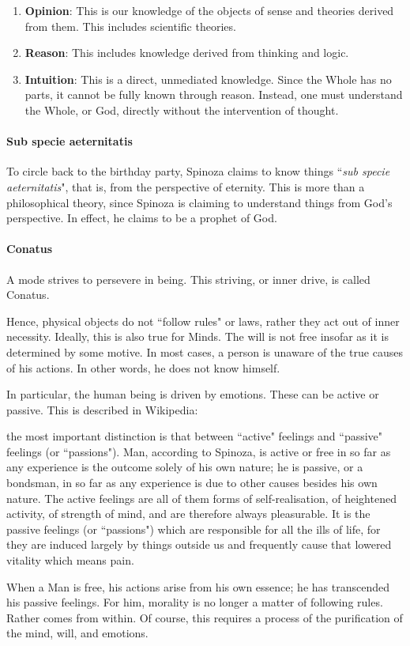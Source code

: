 \begin{enumerate}
\item \textbf{Opinion}: This is our knowledge of the objects of sense and theories derived from them. This includes scientific theories. 
\item \textbf{Reason}: This includes knowledge derived from thinking and logic. 
\item \textbf{Intuition}: This is a direct, unmediated knowledge. Since the Whole has no parts, it cannot be fully known through reason. Instead, one must understand the Whole, or God, directly without the intervention of thought. 
\end{enumerate}
\paragraph{Sub specie aeternitatis}
To circle back to the birthday party, Spinoza claims to know things ``\emph{sub specie aeternitatis}", that is, from the perspective of eternity. This is more than a philosophical theory, since Spinoza is claiming to understand things from God's perspective. In effect, he claims to be a prophet of God.

\paragraph{Conatus}
A mode strives to persevere in being. This striving, or inner drive, is called Conatus.

Hence, physical objects do not ``follow rules" or laws, rather they act out of inner necessity. Ideally, this is also true for Minds. The will is not free insofar as it is determined by some motive. In most cases, a person is unaware of the true causes of his actions. In other words, he does not know himself.

In particular, the human being is driven by emotions. These can be active or passive. This is described in Wikipedia:

\begin{quotex}
the most important distinction is that between ``active" feelings and ``passive" feelings (or ``passions"). Man, according to Spinoza, is active or free in so far as any experience is the outcome solely of his own nature; he is passive, or a bondsman, in so far as any experience is due to other causes besides his own nature. The active feelings are all of them forms of self-realisation, of heightened activity, of strength of mind, and are therefore always pleasurable. It is the passive feelings (or ``passions") which are responsible for all the ills of life, for they are induced largely by things outside us and frequently cause that lowered vitality which means pain.

\end{quotex}
When a Man is free, his actions arise from his own essence; he has transcended his passive feelings. For him, morality is no longer a matter of following rules. Rather comes from within. Of course, this requires a process of the purification of the mind, will, and emotions.

